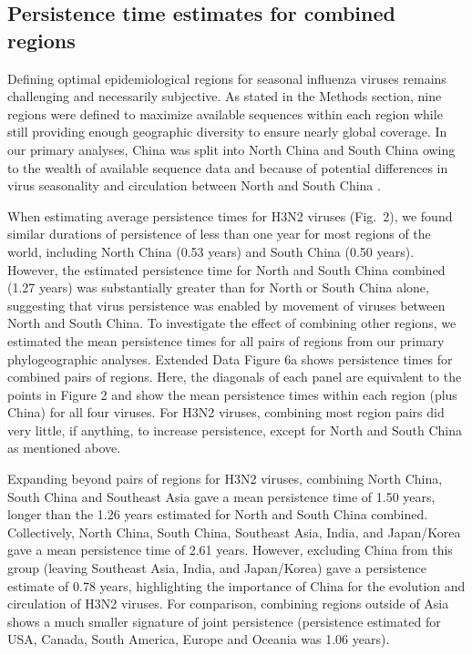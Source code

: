 \documentclass[11pt,oneside,letterpaper]{article}
\begin{document}
\subsection*{Persistence time estimates for combined regions}

Defining optimal epidemiological regions for seasonal influenza viruses remains challenging and necessarily subjective.
As stated in the Methods section, nine regions were defined to maximize available sequences within each region while still providing enough geographic diversity to ensure nearly global coverage.
In our primary analyses, China was split into North China and South China owing to the wealth of available sequence data and because of potential differences in virus seasonality and circulation between North and South China \cite{Yu13}.

When estimating average persistence times for H3N2 viruses (Fig.~2), we found similar durations of persistence of less than one year for most regions of the world, including North China (0.53 years) and South China (0.50 years).
However, the estimated persistence time for North and South China combined (1.27 years) was substantially greater than for North or South China alone, suggesting that virus persistence was enabled by movement of viruses between North and South China.
To investigate the effect of combining other regions, we estimated the mean persistence times for all pairs of regions from our primary phylogeographic analyses.
Extended Data Figure 6a shows persistence times for combined pairs of regions.
Here, the diagonals of each panel are equivalent to the points in Figure 2 and show the mean persistence times within each region (plus China) for all four viruses.
For H3N2 viruses, combining most region pairs did very little, if anything, to increase persistence, except for North and South China as mentioned above.

Expanding beyond pairs of regions for H3N2 viruses, combining North China, South China and Southeast Asia gave a mean persistence time of 1.50 years, longer than the 1.26 years estimated for North and South China combined.
Collectively, North China, South China, Southeast Asia, India, and Japan/Korea gave a mean persistence time of 2.61 years.
However, excluding China from this group (leaving Southeast Asia, India, and Japan/Korea) gave a persistence estimate of 0.78 years, highlighting the importance of China for the evolution and circulation of H3N2 viruses.
For comparison, combining regions outside of Asia shows a much smaller signature of joint persistence (persistence estimated for USA, Canada, South America, Europe and Oceania was 1.06 years).
\end{document}
